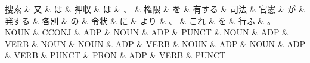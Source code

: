 \documentclass[tikz,border=5pt]{standalone}
\begin{document}
\normalsize
\begin{dependency}[edge unit distance=12.0pt]
    \begin{deptext}[column sep=1em]
        捜索 \& 又 \& は \& 押収 \& は \& 、 \& 権限 \& を \& 有する \& 司法 \& 官憲 \& が \& 発する \& 各別 \& の \& 令状 \& に \& より \& 、 \& これ \& を \& 行ふ \& 。\\
        NOUN \& CCONJ \& ADP \& NOUN \& ADP \& PUNCT \& NOUN \& ADP \& VERB \& NOUN \& NOUN \& ADP \& VERB \& NOUN \& ADP \& NOUN \& ADP \& VERB \& PUNCT \& PRON \& ADP \& VERB \& PUNCT\\
    \end{deptext}
\end{dependency}
\end{document}
